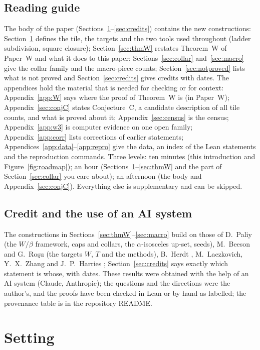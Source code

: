 \documentclass[11pt,reqno]{amsart}
\theoremstyle{plain}
\theoremstyle{definition}
\begin{document}
\subsection{Reading guide}
The body of the paper (Sections~\ref{sec:setting}--\ref{sec:credits}) contains the new constructions: Section~\ref{sec:setting} defines the tile, the targets and the two tools used throughout (ladder subdivision, square closure); Section~\ref{sec:thmW} restates Theorem~W of Paper~W and what it does to this paper; Sections~\ref{sec:collar} and~\ref{sec:macro} give the collar family and the macro-piece counts; Section~\ref{sec:notproved} lists what is not proved and Section~\ref{sec:credits} gives credits with dates.
The appendices hold the material that is needed for checking or for context: Appendix~\ref{app:W} says where the proof of Theorem~W is (in Paper~W); Appendix~\ref{sec:conjC} states Conjecture~C, a candidate description of all tile counts, and what is proved about it; Appendix~\ref{sec:census} is the census; Appendix~\ref{app:w3} is computer evidence on one open family; Appendix~\ref{app:corr} lists corrections of earlier statements; Appendices~\ref{app:data}--\ref{app:repro} give the data, an index of the Lean statements and the reproduction commands.
Three levels: ten minutes (this introduction and Figure~\ref{fig:roadmap}); an hour (Sections~\ref{sec:setting}--\ref{sec:thmW} and the part of Section~\ref{sec:collar} you care about); an afternoon (the body and Appendix~\ref{sec:conjC}). Everything else is supplementary and can be skipped.

\subsection{Credit and the use of an AI system}
The constructions in Sections~\ref{sec:thmW}--\ref{sec:macro} build on those of D.~Paliy (the $W/\beta$ framework, caps and collars, the $\alpha$-isosceles up-set, seeds), M.~Beeson and G.~Ro\c{s}u (the targets $W$, $T$ and the methods), B.~Herdt \cite{Herdt}, M.~Laczkovich, Y.~X.~Zhang and J.~P.~Harries \cite{Harries}; Section~\ref{sec:credits} says exactly which statement is whose, with dates.
These results were obtained with the help of an AI system (Claude, Anthropic); the questions and the directions were the author's, and the proofs have been checked in Lean or by hand as labelled; the provenance table is in the repository README.

\section{Setting}\label{sec:setting}
\end{document}

